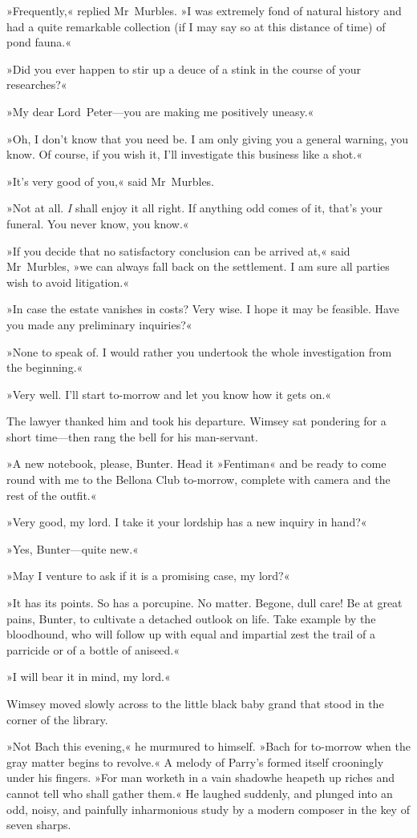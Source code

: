 »Frequently,« replied Mr~Murbles. »I was extremely fond of natural history and had a quite remarkable collection (if I may say so at this distance of time) of pond fauna.«

»Did you ever happen to stir up a deuce of a stink in the course of your researches?«

»My dear Lord~Peter—you are making me positively uneasy.«

»Oh, I don't know that you need be. I am only giving you a general warning, you know. Of course, if you wish it, I'll investigate this business like a shot.«

»It's very good of you,« said Mr~Murbles.

»Not at all. \textit{I} shall enjoy it all right. If anything odd comes of it, that's your funeral. You never know, you know.«

»If you decide that no satisfactory conclusion can be arrived at,« said Mr~Murbles, »we can always fall back on the settlement. I am sure all parties wish to avoid litigation.«

»In case the estate vanishes in costs? Very wise. I hope it may be feasible. Have you made any preliminary inquiries?«

»None to speak of. I would rather you undertook the whole investigation from the beginning.«

»Very well. I'll start to-morrow and let you know how it gets on.«

The lawyer thanked him and took his departure. Wimsey sat pondering for a short time—then rang the bell for his man-servant.

»A new notebook, please, Bunter. Head it »Fentiman« and be ready to come round with me to the Bellona Club to-morrow, complete with camera and the rest of the outfit.«

»Very good, my lord. I take it your lordship has a new inquiry in hand?«

»Yes, Bunter—quite new.«

»May I venture to ask if it is a promising case, my lord?«

»It has its points. So has a porcupine. No matter. Begone, dull care! Be at great pains, Bunter, to cultivate a detached outlook on life. Take example by the bloodhound, who will follow up with equal and impartial zest the trail of a parricide or of a bottle of aniseed.«

»I will bear it in mind, my lord.«

Wimsey moved slowly across to the little black baby grand that stood in the corner of the library.

»Not Bach this evening,« he murmured to himself. »Bach for to-morrow when the gray matter begins to revolve.« A melody of Parry's formed itself crooningly under his fingers. »For man worketh in a vain shadow\textellipsis  he heapeth up riches and cannot tell who shall gather them.« He laughed suddenly, and plunged into an odd, noisy, and painfully inharmonious study by a modern composer in the key of seven sharps.